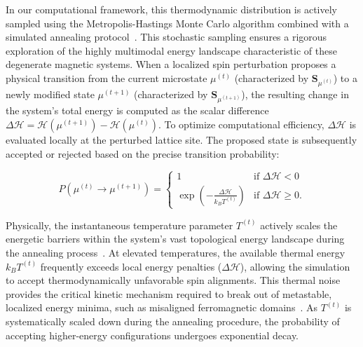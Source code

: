 \documentclass[final,5p,times,twocolumn]{elsarticle}
\begin{document}
In our computational framework, this thermodynamic distribution is actively sampled using the Metropolis-Hastings Monte Carlo algorithm combined with a simulated annealing protocol~\cite{landau2021guide}. This stochastic sampling ensures a rigorous exploration of the highly multimodal energy landscape characteristic of these degenerate magnetic systems. When a localized spin perturbation proposes a physical transition from the current microstate $\mu^{(t)}$ (characterized by $\mathbf{S}_{\mu^{(t)}}$) to a newly modified state $\mu^{(t+1)}$ (characterized by $\mathbf{S}_{\mu^{(t+1)}}$), the resulting change in the system's total energy is computed as the scalar difference $\Delta \mathcal{H} = \mathcal{H}(\mu^{(t+1)}) - \mathcal{H}(\mu^{(t)})$. To optimize computational efficiency, $\Delta \mathcal{H}$ is evaluated locally at the perturbed lattice site. The proposed state is subsequently accepted or rejected based on the precise transition probability:

\begin{equation}\label{eq:Metropolis}
P(\mu^{(t)} \rightarrow \mu^{(t+1)}) = \begin{cases}
1 & \text{if } \Delta \mathcal{H} < 0 \\
\exp\left(-\frac{\Delta \mathcal{H}}{k_B T^{(t)}}\right) & \text{if } \Delta \mathcal{H} \geq 0.
\end{cases}
\end{equation}

Physically, the instantaneous temperature parameter $T^{(t)}$ actively scales the energetic barriers within the system's vast topological energy landscape during the annealing process~\cite{landau2021guide}. At elevated temperatures, the available thermal energy $k_B T^{(t)}$ frequently exceeds local energy penalties ($\Delta \mathcal{H}$), allowing the simulation to accept thermodynamically unfavorable spin alignments. This thermal noise provides the critical kinetic mechanism required to break out of metastable, localized energy minima, such as misaligned ferromagnetic domains~\cite{desplat2018thermal}. As $T^{(t)}$ is systematically scaled down during the annealing procedure, the probability of accepting higher-energy configurations undergoes exponential decay. 
\end{document}
